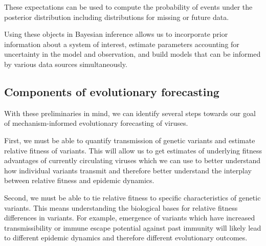 These expectations can be used to compute the probability of events under the posterior distribution including distributions for missing or future data.



Using these objects in Bayesian inference allows us to incorporate prior information about a system of interest, estimate parameters accounting for uncertainty in the model and observation, and build models that can be informed by various data sources simultaneously. 

\subsection{Components of evolutionary forecasting}%


With these preliminaries in mind, we can identify several steps towards our goal of mechanism-informed evolutionary forecasting of viruses.

First, we must be able to quantify transmission of genetic variants and estimate relative fitness of variants.
This will allow us to get estimates of underlying fitness advantages of currently circulating viruses which we can use to better understand how individual variants transmit and therefore better understand the interplay between relative fitness and epidemic dynamics.

Second, we must be able to tie relative fitness to specific characteristics of genetic variants.
This means understanding the biological bases for relative fitness differences in variants.
For example, emergence of variants which have increased transmissibility or immune escape potential against past immunity will likely lead to different epidemic dynamics and therefore different evolutionary outcomes. 

